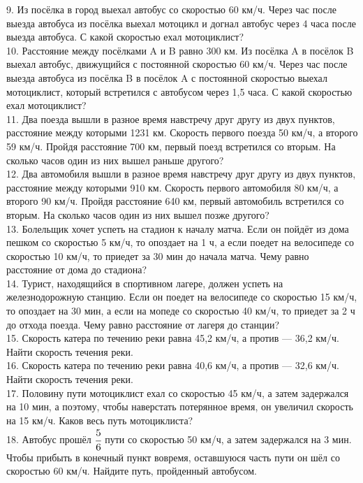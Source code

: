 9. Из посёлка в город выехал автобус со скоростью 60 км/ч. Через час после выезда автобуса из посёлка выехал мотоцикл и догнал автобус через 4 часа после выезда автобуса. С какой скоростью ехал мотоциклист?\\
10. Расстояние между посёлками A и B равно 300 км. Из посёлка A в посёлок B выехал автобус, движущийся с постоянной скоростью 60 км/ч. Через час после выезда автобуса из посёлка B в посёлок A с постоянной скоростью выехал мотоциклист, который встретился с автобусом через 1,5 часа. С какой скоростью ехал мотоциклист?\\
11. Два поезда вышли в разное время навстречу друг другу из двух пунктов, расстояние между которыми 1231 км. Скорость первого поезда 50 км/ч, а второго 59 км/ч. Пройдя расстояние 700 км, первый поезд встретился со вторым. На сколько часов один из них вышел раньше другого?\\
12. Два автомобиля вышли в разное время навстречу друг другу из двух пунктов, расстояние между которыми 910 км. Скорость первого автомобиля 80 км/ч, а второго 90 км/ч. Пройдя расстояние 640 км, первый автомобиль встретился со вторым. На сколько часов один из них вышел позже другого?\\
13. Болельщик хочет успеть на стадион к началу матча. Если он пойдёт из дома пешком со скоростью 5 км/ч, то опоздает на 1 ч, а если поедет на велосипеде со скоростью 10 км/ч, то приедет за 30 мин до начала матча. Чему равно расстояние от дома до стадиона?\\
14. Турист, находящийся в спортивном лагере, должен успеть на железнодорожную станцию. Если он поедет на велосипеде со скоростью 15 км/ч, то опоздает на 30 мин, а если на мопеде со скоростью 40 км/ч, то приедет за 2 ч до отхода поезда. Чему равно расстояние от лагеря до станции?\\
15. Скорость катера по течению реки равна 45,2 км/ч, а против --- 36,2 км/ч. Найти скорость течения реки.\\
16. Скорость катера по течению реки равна 40,6 км/ч, а против --- 32,6 км/ч. Найти скорость течения реки.\\
17. Половину пути мотоциклист ехал со скоростью 45 км/ч, а затем задержался на 10 мин, а поэтому, чтобы наверстать потерянное время, он увеличил скорость на 15 км/ч. Каков весь путь мотоциклиста?\\
18. Автобус прошёл $\cfrac{5}{6}$ пути со скоростью 50 км/ч, а затем задержался на 3 мин. Чтобы прибыть в конечный пункт вовремя, оставшуюся часть пути он шёл со скоростью 60 км/ч. Найдите путь, пройденный автобусом.\\

